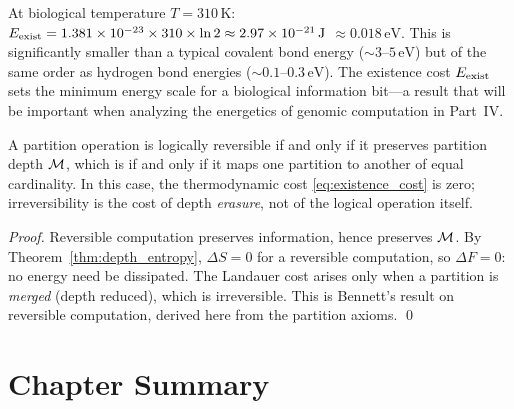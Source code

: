\begin{remark}
At biological temperature $T = 310\,\mathrm{K}$:
$E_{\mathrm{exist}} = 1.381\times10^{-23} \times 310 \times \ln 2 \approx 2.97\times10^{-21}\,\mathrm{J}$
$\approx 0.018\,\mathrm{eV}$. This is significantly smaller than a typical
covalent bond energy ($\sim 3$--$5\,\mathrm{eV}$) but of the same order as
hydrogen bond energies ($\sim 0.1$--$0.3\,\mathrm{eV}$). The existence cost
$E_{\mathrm{exist}}$ sets the minimum energy scale for a biological information bit---a
result that will be important when analyzing the energetics of genomic computation
in Part~IV.
\end{remark}

\begin{corollary}
\label{cor:bennett}
A partition operation is logically reversible if and only if it preserves
partition depth $\mathcal{M}$, which is if and only if it maps one partition to
another of equal cardinality. In this case, the thermodynamic cost
\eqref{eq:existence_cost} is zero; irreversibility is the cost of depth
\emph{erasure}, not of the logical operation itself.
\end{corollary}

\begin{proof}
Reversible computation preserves information, hence preserves $\mathcal{M}$.
By Theorem~\ref{thm:depth_entropy}, $\Delta S = 0$ for a reversible computation,
so $\Delta F = 0$: no energy need be dissipated. The Landauer cost arises only
when a partition is \emph{merged} (depth reduced), which is irreversible.
This is Bennett's result on reversible computation, derived here from the
partition axioms. \qed
\end{proof}

\section*{Chapter Summary}
\label{sec:ch1_summary}


